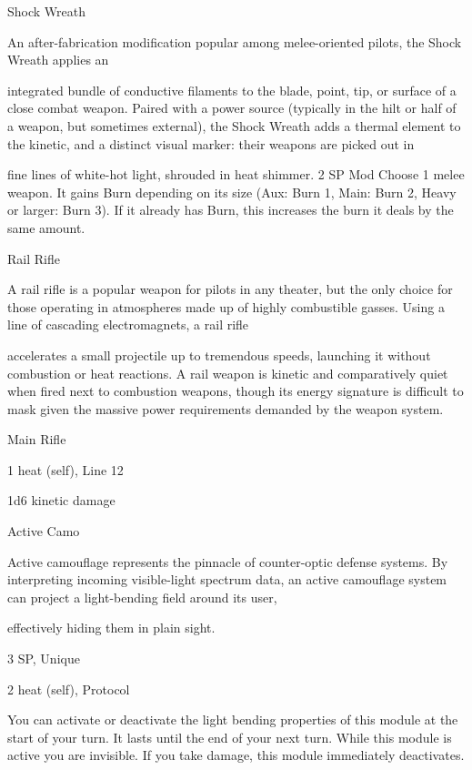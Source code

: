 Shock Wreath  

An after-fabrication modification popular among melee-oriented pilots, the Shock Wreath applies an  

integrated bundle of conductive filaments to the blade, point, tip, or surface of a close combat weapon.  
Paired with a power source (typically in the hilt or half of a weapon, but sometimes external), the Shock  
Wreath adds a thermal element to the kinetic, and a distinct visual marker: their weapons are picked out in  

fine lines of white-hot light, shrouded in heat shimmer.     
2 SP  
Mod  
Choose 1 melee weapon. It gains Burn depending on its size (Aux: Burn 1, Main: Burn 2, Heavy  
or larger: Burn 3). If it already has Burn, this increases the burn it deals by the same amount.
 

Rail Rifle  

A rail rifle is a popular weapon for pilots in any theater, but the only choice for those operating in  
atmospheres made up of highly combustible gasses. Using a line of cascading electromagnets, a rail rifle  

accelerates a small projectile up to tremendous speeds, launching it without combustion or heat reactions.  
A rail weapon is kinetic and comparatively quiet when fired next to combustion weapons, though its energy  
signature is difficult to mask given the massive power requirements demanded by the weapon system.   

Main Rifle
 
1 heat (self), Line 12
 
1d6 kinetic damage
 

Active Camo  

Active camouflage represents the pinnacle of counter-optic defense systems. By interpreting incoming  
visible-light spectrum data, an active camouflage system can project a light-bending field around its user,  

effectively hiding them in plain sight.    

3 SP, Unique  

2 heat (self), Protocol
 

                                                                                                                   


You can activate or deactivate the light bending properties of this module at the start of your  
turn. It lasts until the end of your next turn. While this module is active you are invisible. If you  
take damage, this module immediately deactivates.
 

